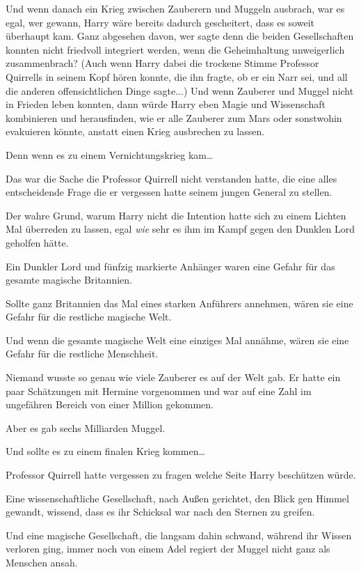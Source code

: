 {Und wenn danach ein Krieg zwischen Zauberern und Muggeln ausbrach, war es egal, wer gewann, Harry wäre bereits dadurch gescheitert, dass es soweit überhaupt kam. Ganz abgesehen davon, wer sagte denn die beiden Gesellschaften konnten nicht friedvoll integriert werden, wenn die Geheimhaltung unweigerlich zusammenbrach? (Auch wenn Harry dabei die trockene Stimme Professor Quirrells in seinem Kopf hören konnte, die ihn fragte, ob er ein Narr sei, und all die anderen offensichtlichen Dinge sagte...) Und wenn Zauberer und Muggel nicht in Frieden leben konnten, dann würde Harry eben Magie und Wissenschaft kombinieren und herausfinden, wie er alle Zauberer zum Mars oder sonstwohin evakuieren könnte, anstatt einen Krieg ausbrechen zu lassen.

Denn wenn es zu einem Vernichtungskrieg kam…

Das war die Sache die Professor Quirrell nicht verstanden hatte, die eine alles entscheidende Frage die er vergessen hatte seinem jungen General zu stellen.

Der wahre Grund, warum Harry nicht die Intention hatte sich zu einem Lichten Mal überreden zu lassen, egal \emph{wie} sehr es ihm im Kampf gegen den Dunklen Lord geholfen hätte.

Ein Dunkler Lord und fünfzig markierte Anhänger waren eine Gefahr für das gesamte magische Britannien.

Sollte ganz Britannien das Mal eines starken Anführers annehmen, wären sie eine Gefahr für die restliche magische Welt.

Und wenn die gesamte magische Welt eine einziges Mal annähme, wären sie eine Gefahr für die restliche Menschheit.

Niemand wusste so genau wie viele Zauberer es auf der Welt gab. Er hatte ein paar Schätzungen mit Hermine vorgenommen und war auf eine Zahl im ungefähren Bereich von einer Million gekommen.

Aber es gab sechs Milliarden Muggel.

Und sollte es zu einem finalen Krieg kommen…

Professor Quirrell hatte vergessen zu fragen welche Seite Harry beschützen würde.

Eine wissenschaftliche Gesellschaft, nach Außen gerichtet, den Blick gen Himmel gewandt, wissend, dass es ihr Schicksal war nach den Sternen zu greifen.

Und eine magische Gesellschaft, die langsam dahin schwand, während ihr Wissen verloren ging, immer noch von einem Adel regiert der Muggel nicht ganz als Menschen ansah.

}
